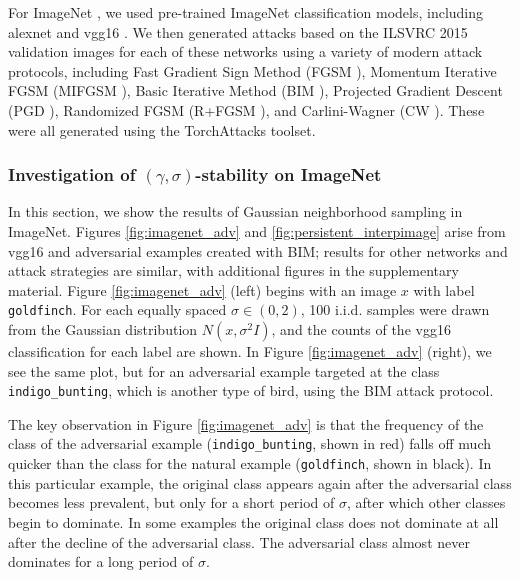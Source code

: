 For ImageNet \citep{Imagenet-old}, we used pre-trained ImageNet classification models, including alexnet \cite{alexnet} and vgg16 \cite{simonyan2014very}.
We then generated attacks based on the ILSVRC 2015 \citep{ILSVRC15} validation images for each of these networks using a variety of modern attack protocols, including Fast Gradient Sign Method (FGSM \citep{goodfellow_explaining_2014}), Momentum Iterative FGSM (MIFGSM \citep{dongMIFGSM}), Basic Iterative Method (BIM \citep{kurakin_adversarial_2016}), Projected Gradient Descent (PGD \citep{madry_towards_2017}), Randomized FGSM (R+FGSM \citep{tramer2018ensemble}), and Carlini-Wagner (CW \citep{carliniwagner}). These were all generated using the TorchAttacks \cite{kim2021torchattacks} toolset.

\subsubsection{Investigation of $(\gamma, \sigma)$-stability on ImageNet}

In this section, we show the results of Gaussian neighborhood sampling in ImageNet. Figures \ref{fig:imagenet_adv} and \ref{fig:persistent_interpimage} arise from vgg16 and adversarial examples created with BIM; results for other networks and attack strategies are similar, with additional figures in the supplementary material. Figure \ref{fig:imagenet_adv} (left) begins with an image $x$ with label \texttt{goldfinch}. For each equally spaced $\sigma\in(0,2)$, 100 i.i.d. samples were drawn from the Gaussian distribution $N(x,\sigma^2I)$, and the counts of the vgg16 classification for each label are shown. In Figure \ref{fig:imagenet_adv} (right), we see the same plot, but for an adversarial example targeted at the class \texttt{indigo\_bunting}, which is another type of bird, using the BIM attack protocol. %

The key observation in Figure \ref{fig:imagenet_adv} is that the frequency of the class of the adversarial example (\texttt{indigo\_bunting}, shown in red) falls off much quicker than the class for the natural example (\texttt{goldfinch}, shown in black). In this particular example, the original class appears again after the adversarial class becomes less prevalent, but only for a short period of $\sigma$, after which other classes begin to dominate. In some examples the original class does not dominate at all after the decline of the adversarial class. The adversarial class almost never dominates for a long period of $\sigma$. 



